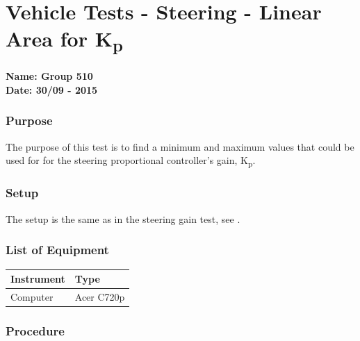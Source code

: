 \pagebreak
\section{Vehicle Tests - Steering - Linear Area for \si{K_p}} \label{app:LinearAreaKp}
\textbf{Name: Group 510}\\
\textbf{Date: 30/09 - 2015}

\subsubsection{Purpose}
The purpose of this test is to find a minimum and maximum values that could be used for for the steering proportional controller's gain, \si{K_p}.

\subsubsection{Setup}
The setup is the same as in the steering gain test, see .

\subsubsection{List of Equipment}

\begin{table}[H]
\begin{tabular}{|p{10cm}|p{4cm}|}
\hline%
  \textbf{Instrument}                     &  \textbf{Type}       \\
\hline%
  Computer                                &  Acer C720p    \\
\hline %
\end{tabular}
\end{table}

\subsubsection{Procedure}

